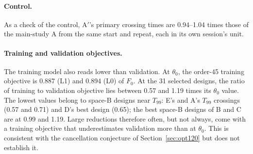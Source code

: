 \documentclass{anvil-paper}
\begin{document}
\paragraph{Control.}
As a check of the control,
A$'$'s primary crossing times are 0.94--1.04 times those of the main-study A
from the same start and repeat, each in its own session's unit.

\paragraph{Training and validation objectives.}
The training model also reads lower than validation. At $\theta_0$, the
order-45 training objective is 0.887 (L1) and 0.894 (L0) of $F_0$. At the
31 selected designs, the ratio of training to validation objective lies
between 0.57 and 1.19 times its $\theta_0$ value. The lowest values belong
to space-B designs near $T_{99}$: E's and A's $T_{99}$ crossings (0.57 and
0.71) and D's best design (0.65); the best space-B designs of B and C are at
0.99 and 1.19. Large reductions therefore often, but not always, come with a
training objective that underestimates validation more than at $\theta_0$.
This is consistent with the cancellation conjecture of
Section~\ref{sec:opt120} but does not establish it.
\end{document}
